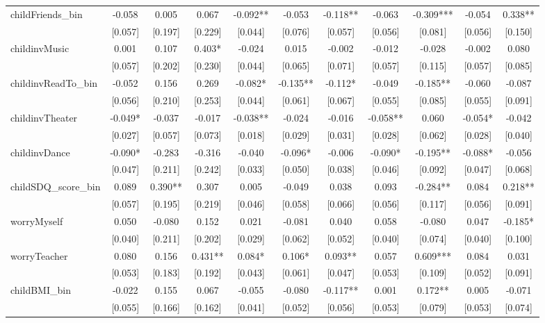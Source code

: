 \documentclass[12pt]{article}
\begin{document}
\begin{table}[ht]
\begin{center}
\begin{adjustbox}{width=1.2\textwidth,center=\textwidth}
\begin{tabular}{l*{10}{c}}
childFriends\_bin & -0.058 & 0.005 & 0.067 & -0.092** & -0.053 & -0.118** & -0.063 & -0.309*** & -0.054 & 0.338** \\
 & [0.057] & [0.197] & [0.229] & [0.044] & [0.076] & [0.057] & [0.056] & [0.081] & [0.056] & [0.150] \\
childinvMusic & 0.001 & 0.107 & 0.403* & -0.024 & 0.015 & -0.002 & -0.012 & -0.028 & -0.002 & 0.080 \\
 & [0.057] & [0.202] & [0.230] & [0.044] & [0.065] & [0.071] & [0.057] & [0.115] & [0.057] & [0.085] \\
childinvReadTo\_bin & -0.052 & 0.156 & 0.269 & -0.082* & -0.135** & -0.112* & -0.049 & -0.185** & -0.060 & -0.087 \\
 & [0.056] & [0.210] & [0.253] & [0.044] & [0.061] & [0.067] & [0.055] & [0.085] & [0.055] & [0.091] \\
childinvTheater & -0.049* & -0.037 & -0.017 & -0.038** & -0.024 & -0.016 & -0.058** & 0.060 & -0.054* & -0.042 \\
 & [0.027] & [0.057] & [0.073] & [0.018] & [0.029] & [0.031] & [0.028] & [0.062] & [0.028] & [0.040] \\
childinvDance & -0.090* & -0.283 & -0.316 & -0.040 & -0.096* & -0.006 & -0.090* & -0.195** & -0.088* & -0.056 \\
 & [0.047] & [0.211] & [0.242] & [0.033] & [0.050] & [0.038] & [0.046] & [0.092] & [0.047] & [0.068] \\
childSDQ\_score\_bin & 0.089 & 0.390** & 0.307 & 0.005 & -0.049 & 0.038 & 0.093 & -0.284** & 0.084 & 0.218** \\
 & [0.057] & [0.195] & [0.219] & [0.046] & [0.058] & [0.066] & [0.056] & [0.117] & [0.056] & [0.091] \\
worryMyself & 0.050 & -0.080 & 0.152 & 0.021 & -0.081 & 0.040 & 0.058 & -0.080 & 0.047 & -0.185* \\
 & [0.040] & [0.211] & [0.202] & [0.029] & [0.062] & [0.052] & [0.040] & [0.074] & [0.040] & [0.100] \\
worryTeacher & 0.080 & 0.156 & 0.431** & 0.084* & 0.106* & 0.093** & 0.057 & 0.609*** & 0.084 & 0.031 \\
 & [0.053] & [0.183] & [0.192] & [0.043] & [0.061] & [0.047] & [0.053] & [0.109] & [0.052] & [0.091] \\
childBMI\_bin & -0.022 & 0.155 & 0.067 & -0.055 & -0.080 & -0.117** & 0.001 & 0.172** & 0.005 & -0.071 \\
 & [0.055] & [0.166] & [0.162] & [0.041] & [0.052] & [0.056] & [0.053] & [0.079] & [0.053] & [0.074] \\

\end{tabular}
\end{adjustbox}
\end{center}
\end{table}
\end{document}
